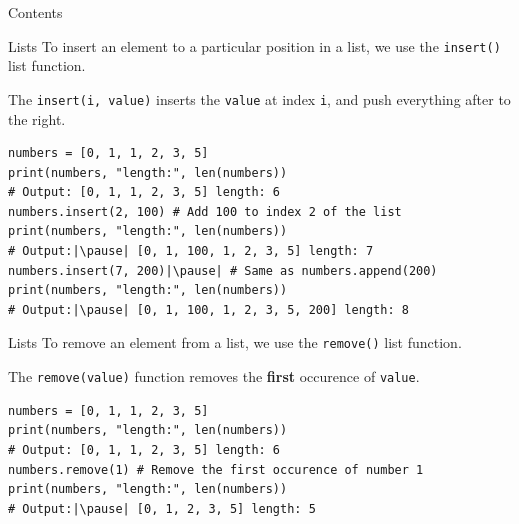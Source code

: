 \documentclass[dvipsnames, svgnames, x11names, handout]{beamer}
\begin{document}
\begin{frame}{Contents} 
\begin{center}
\end{center}
\end{frame}

\begin{frame}[fragile]{Lists}
To insert an element to a particular position in a list, we use the \texttt{insert()} list function.

The \texttt{insert(i, value)} inserts the \texttt{value} at index \texttt{i}, and push everything after to the right. \pause
\begin{verbatim}
numbers = [0, 1, 1, 2, 3, 5]
print(numbers, "length:", len(numbers)) 
# Output: [0, 1, 1, 2, 3, 5] length: 6
numbers.insert(2, 100) # Add 100 to index 2 of the list
print(numbers, "length:", len(numbers))  
# Output:|\pause| [0, 1, 100, 1, 2, 3, 5] length: 7
numbers.insert(7, 200)|\pause| # Same as numbers.append(200)
print(numbers, "length:", len(numbers))  
# Output:|\pause| [0, 1, 100, 1, 2, 3, 5, 200] length: 8
\end{verbatim}
\end{frame}

\begin{frame}[fragile]{Lists}
To remove an element from a list, we use the \texttt{remove()} list function.

The \texttt{remove(value)} function removes the \textbf{first} occurence of \texttt{value}. \pause
\begin{verbatim}
numbers = [0, 1, 1, 2, 3, 5]
print(numbers, "length:", len(numbers)) 
# Output: [0, 1, 1, 2, 3, 5] length: 6
numbers.remove(1) # Remove the first occurence of number 1
print(numbers, "length:", len(numbers))
# Output:|\pause| [0, 1, 2, 3, 5] length: 5
\end{verbatim}
\end{frame}
\end{document}
